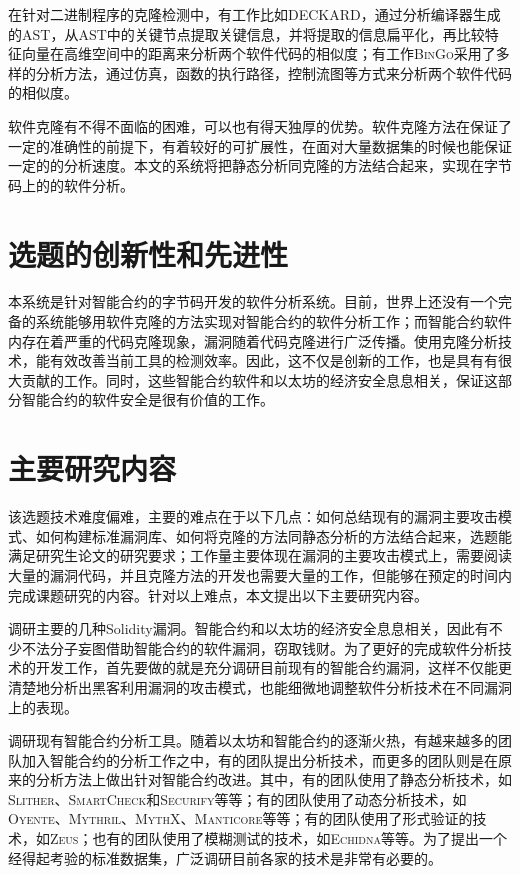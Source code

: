 在针对二进制程序的克隆检测中，有工作比如\textsc{DECKARD}\cite{deckard}，通过分析编译器生成的AST，从AST中的关键节点提取关键信息，并将提取的信息扁平化，再比较特征向量在高维空间中的距离来分析两个软件代码的相似度；有工作\textsc{BinGo}\cite{bingo}采用了多样的分析方法，通过仿真，函数的执行路径，控制流图等方式来分析两个软件代码的相似度。

软件克隆有不得不面临的困难，可以也有得天独厚的优势。软件克隆方法在保证了一定的准确性的前提下，有着较好的可扩展性，在面对大量数据集的时候也能保证一定的的分析速度。本文的系统将把静态分析同克隆的方法结合起来，实现在字节码上的的软件分析。

\section{选题的创新性和先进性}

本系统是针对智能合约的字节码开发的软件分析系统。目前，世界上还没有一个完备的系统能够用软件克隆的方法实现对智能合约的软件分析工作；而智能合约软件内存在着严重的代码克隆现象，漏洞随着代码克隆进行广泛传播。使用克隆分析技术，能有效改善当前工具的检测效率。因此，这不仅是创新的工作，也是具有有很大贡献的工作。同时，这些智能合约软件和以太坊的经济安全息息相关，保证这部分智能合约的软件安全是很有价值的工作。

\section{主要研究内容}

该选题技术难度偏难，主要的难点在于以下几点：如何总结现有的漏洞主要攻击模式、如何构建标准漏洞库、如何将克隆的方法同静态分析的方法结合起来，选题能满足研究生论文的研究要求；工作量主要体现在漏洞的主要攻击模式上，需要阅读大量的漏洞代码，并且克隆方法的开发也需要大量的工作，但能够在预定的时间内完成课题研究的内容。针对以上难点，本文提出以下主要研究内容。

调研主要的几种Solidity漏洞。智能合约和以太坊的经济安全息息相关，因此有不少不法分子妄图借助智能合约的软件漏洞，窃取钱财。为了更好的完成软件分析技术的开发工作，首先要做的就是充分调研目前现有的智能合约漏洞，这样不仅能更清楚地分析出黑客利用漏洞的攻击模式，也能细微地调整软件分析技术在不同漏洞上的表现。

调研现有智能合约分析工具。随着以太坊和智能合约的逐渐火热，有越来越多的团队加入智能合约的分析工作之中，有的团队提出分析技术，而更多的团队则是在原来的分析方法上做出针对智能合约改进。其中，有的团队使用了静态分析技术，如\textsc{Slither}\cite{slither}、\textsc{SmartCheck}\cite{smartcheck}和\textsc{Securify}\cite{securify}等等；有的团队使用了动态分析技术，如\textsc{Oyente}\cite{oyente}、\textsc{Mythril}\cite{mythril}、\textsc{MythX}\cite{mythx}、\textsc{Manticore}\cite{manticore}等等；有的团队使用了形式验证的技术，如\textsc{Zeus}\cite{zeus}；也有的团队使用了模糊测试的技术，如\textsc{Echidna}\cite{echidna}等等。为了提出一个经得起考验的标准数据集，广泛调研目前各家的技术是非常有必要的。

